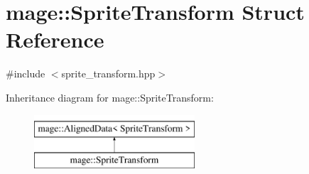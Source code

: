 \hypertarget{structmage_1_1_sprite_transform}{}\section{mage\+:\+:Sprite\+Transform Struct Reference}
\label{structmage_1_1_sprite_transform}


{\ttfamily \#include $<$sprite\+\_\+transform.\+hpp$>$}

Inheritance diagram for mage\+:\+:Sprite\+Transform\+:\begin{figure}[H]
\begin{center}
\leavevmode
\includegraphics[height=2.000000cm]{structmage_1_1_sprite_transform}
\end{center}
\end{figure}
